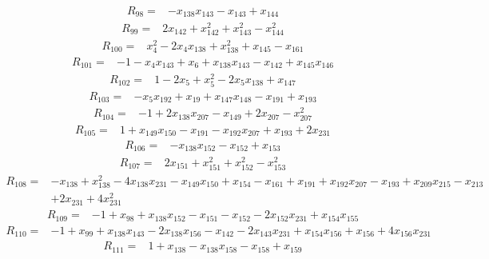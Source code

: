 \begin{align*}
 R_{98}={}&-x_{138}x_{143} -x_{143} +x_{144}
\end{align*}
\begin{align*}
 R_{99}={}&2x_{142} +x_{142}^{2} +x_{143}^{2} -x_{144}^{2}
\end{align*}
\begin{align*}
 R_{100}={}&x_{4}^{2} -2x_{4}x_{138} +x_{138}^{2} +x_{145} -x_{161}
\end{align*}
\begin{align*}
 R_{101}={}&-1 -x_{4}x_{143} +x_{6} +x_{138}x_{143} -x_{142} +x_{145}x_{146}
\end{align*}
\begin{align*}
 R_{102}={}&1 -2x_{5} +x_{5}^{2} -2x_{5}x_{138} +x_{147}
\end{align*}
\begin{align*}
 R_{103}={}&-x_{5}x_{192} +x_{19} +x_{147}x_{148} -x_{191} +x_{193}
\end{align*}
\begin{align*}
 R_{104}={}&-1 +2x_{138}x_{207} -x_{149} +2x_{207} -x_{207}^{2}
\end{align*}
\begin{align*}
 R_{105}={}&1 +x_{149}x_{150} -x_{191} -x_{192}x_{207} +x_{193} +2x_{231}
\end{align*}
\begin{align*}
 R_{106}={}&-x_{138}x_{152} -x_{152} +x_{153}
\end{align*}
\begin{align*}
 R_{107}={}&2x_{151} +x_{151}^{2} +x_{152}^{2} -x_{153}^{2}
\end{align*}
\begin{align*}
 R_{108}={}&-x_{138} +x_{138}^{2} -4x_{138}x_{231} -x_{149}x_{150} +x_{154} -x_{161} +x_{191} +x_{192}x_{207} -x_{193} +x_{209}x_{215} -x_{213}\\
 &+2x_{231} +4x_{231}^{2}
\end{align*}
\begin{align*}
 R_{109}={}&-1 +x_{98} +x_{138}x_{152} -x_{151} -x_{152} -2x_{152}x_{231} +x_{154}x_{155}
\end{align*}
\begin{align*}
 R_{110}={}&-1 +x_{99} +x_{138}x_{143} -2x_{138}x_{156} -x_{142} -2x_{143}x_{231} +x_{154}x_{156} +x_{156} +4x_{156}x_{231}
\end{align*}
\begin{align*}
 R_{111}={}&1 +x_{138} -x_{138}x_{158} -x_{158} +x_{159}
\end{align*}
